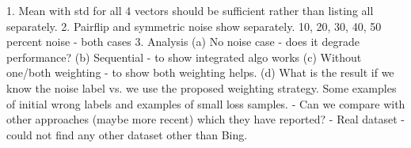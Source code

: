 \color{red}
1. Mean with std for all 4 vectors should be sufficient rather than listing all separately.
2. Pairflip and symmetric noise show separately. 
10, 20, 30, 40, 50 percent noise - both cases 
3. Analysis 
(a) No noise case - does it degrade performance?
(b) Sequential - to show integrated algo works
(c) Without one/both weighting - to show both weighting helps.
(d) What is the result if we know the noise label vs. we use the proposed weighting strategy.
Some examples of initial wrong labels and examples of small loss samples.
- Can we compare with other approaches (maybe more recent) which they have reported?
- Real dataset - could not find any other dataset other than Bing.
\color{black}


